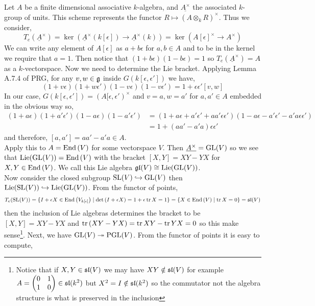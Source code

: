 \documentclass[12pt]{article}
\begin{document}
Let $A$ be a finite dimensional associative $k$-algebra, and $\underline{A^\times}$ the associated $k$-group of units. This scheme represents the functor $R \mapsto (A \otimes_k R)^\times$. Thus we consider,
\[ T_e(\underline{A}^\times) = \ker{(\underline{A}^\times(k[\epsilon]) \to \underline{A}^\times(k))} = \ker{(A[\epsilon]^\times \to A^\times)} \]
We can write any element of $A[\epsilon]$ as $a + b \epsilon$ for $a, b \in A$ and to be in the kernel we require that $a = 1$. Then notice that $(1 + b \epsilon)(1 - b \epsilon) = 1$ so $T_e(\underline{A}^\times) = A$ as a $k$-vectorspace. Now we need to determine the Lie bracket. Applying Lemma A.7.4 of PRG, for any $v,w \in \g$ inside $G(k[\epsilon, \epsilon'])$ we have,
\[ (1 + v \epsilon)(1 + w \epsilon')(1 - v \epsilon)(1 - v \epsilon') = 1 + \epsilon \epsilon' [v, w] \]
In our case, $G(k[\epsilon, \epsilon']) = (A[\epsilon, \epsilon')^\times$ and $v = a, w = a'$ for $a,a' \in A$ embedded in the obvious way so,
\begin{align*}
(1 + a \epsilon)(1 + a' \epsilon')(1 - a \epsilon)(1 - a' \epsilon') & = (1 + a \epsilon + a' \epsilon' + aa' \epsilon \epsilon') (1 - a \epsilon - a' \epsilon' - a'a \epsilon \epsilon') 
\\
& = 1 + (aa' - a'a) \epsilon \epsilon'
\end{align*}
and therefore, $[a, a'] = aa' - a'a \in A$.
\bigskip\\
Apply this to $A = \End{V}$ for some vectorspace $V$. Then $\underline{A^\times} = \GL(V)$ so we see that $\Lie(\GL(V)) = \End{V}$ with the bracket $[X, Y] = XY - YX$ for $X,Y \in \End{V}$. We call this Lie algebra $\gl(V) \cong \Lie(\GL(V))$. 
\bigskip\\
Now consider the closed subgroup $\SL(V) \embed \GL(V)$ then $\Lie(\SL(V)) \embed \Lie(\GL(V))$. From the functor of points, 
\[ T_e(\SL(V)) = \{ I + \epsilon X \in \End{V_{k[\epsilon]}} \mid \det{(I + \epsilon X)} = 1 + \epsilon \tr{X} = 1 \} = \{ X \in \End{V} \mid \tr{X} = 0 \} = \sl(V) \]
then the inclusion of Lie algebras determines the bracket to be $[X,Y] = XY - YX$ and $\tr{(XY - YX)} = \tr{XY} - \tr{YX} = 0$ so this make sense\footnote{Notice that if $X,Y \in \sl(V)$ we may have $XY \notin \sl(V)$ for example $A = \begin{pmatrix}
0 & 1
\\
1 & 0
\end{pmatrix} \in \sl(k^2)$ but $X^2 = I \notin \sl(k^2)$ so the commutator not the algebra structure is what is preserved in the inclusion}. Next, we have $\GL(V) \onto \PGL(V)$. From the functor of points it is easy to compute,
\end{document}
